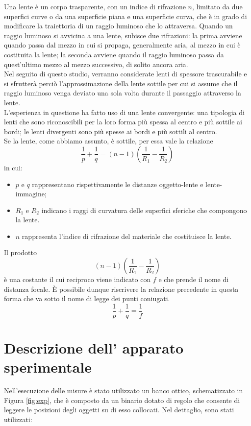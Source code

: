 \documentclass[11pt,a4paper]{article}
\begin{document}
Una lente è un corpo trasparente, con un indice di rifrazione $n$, limitato da due superfici curve o da una superficie piana e una superficie curva, che è in grado di modificare la traiettoria di un raggio luminoso che lo attraversa. Quando un raggio luminoso si avvicina a una lente, subisce due rifrazioni: la prima avviene quando passa dal mezzo in cui si propaga, generalmente aria, al mezzo in cui è costituita la lente; la seconda avviene quando il raggio luminoso passa da quest'ultimo mezzo al mezzo successivo, di solito ancora aria.
\\
Nel seguito di questo studio, verranno considerate lenti di spessore trascurabile e si sfrutterà perciò l'approssimazione della lente sottile per cui si assume che il raggio luminoso venga deviato una sola volta durante il passaggio attraverso la lente.
\\
L'esperienza in questione ha fatto uso di una lente convergente: una tipologia di lenti che sono riconoscibili per la loro forma più spessa al centro e più sottile ai bordi; le lenti divergenti sono più spesse ai bordi e più sottili al centro.
\\
Se la lente, come abbiamo assunto, è sottile, per essa vale la relazione
\begin{equation}
    \frac{1}{p}+\frac{1}{q} = (n - 1) \left(\frac{1}{R_1} - \frac{1}{R_2}\right)
\end{equation}
in cui:
\begin{itemize}
    \item $p$ e $q$ rappresentano rispettivamente le distanze oggetto-lente e lente-immagine;
    \item $R_1$ e $R_2$ indicano i raggi di curvatura delle superfici sferiche che compongono la lente.
    \item $n$ rappresenta l'indice di rifrazione del materiale che costituisce la lente.
\end{itemize}
Il prodotto 
$$(n - 1)\left(\frac{1}{R_1} - \frac{1}{R_2}\right)$$
è una costante il cui reciproco viene indicato con $f$ e che prende il nome di distanza focale. È  possibile dunque riscrivere la relazione precedente in questa forma che va sotto il nome di legge dei punti coniugati.
\begin{equation}
    \frac{1}{p}+\frac{1}{q}=\frac{1}{f}
    \label{eq:punti-coniugati}
\end{equation}

\section{Descrizione dell’ apparato sperimentale}
Nell'esecuzione delle misure è stato utilizzato un banco ottico, schematizzato in Figura \ref{fig:exp}, che è composto da un binario dotato di regolo che consente di leggere le posizioni degli oggetti su di esso collocati. Nel dettaglio, sono stati utilizzati:
\end{document}
